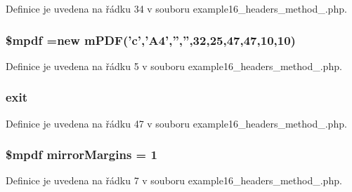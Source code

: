 Definice je uvedena na řádku 34 v souboru example16\-\_\-headers\-\_\-method\-\_.\-php.

\hypertarget{example16__headers__method__2_8php_ad028f81910d6cbab9b184d2214b3a8f8}{
\subsubsection[{\$mpdf}]{\setlength{\rightskip}{0pt plus 5cm}\$mpdf =new {\bf m\-P\-D\-F}('c','A4','','',32,25,47,47,10,10)}}\label{example16__headers__method__2_8php_ad028f81910d6cbab9b184d2214b3a8f8}


Definice je uvedena na řádku 5 v souboru example16\-\_\-headers\-\_\-method\-\_.\-php.

\hypertarget{example16__headers__method__2_8php_a6733eb5f605d09eaede9845835d71c4e}{
\subsubsection[{exit}]{\setlength{\rightskip}{0pt plus 5cm}exit}}\label{example16__headers__method__2_8php_a6733eb5f605d09eaede9845835d71c4e}


Definice je uvedena na řádku 47 v souboru example16\-\_\-headers\-\_\-method\-\_.\-php.

\hypertarget{example16__headers__method__2_8php_a24c284cb7774410f65953584ea1fd9c1}{
\subsubsection[{mirror\-Margins}]{\setlength{\rightskip}{0pt plus 5cm}\$mpdf mirror\-Margins = 1}}\label{example16__headers__method__2_8php_a24c284cb7774410f65953584ea1fd9c1}


Definice je uvedena na řádku 7 v souboru example16\-\_\-headers\-\_\-method\-\_.\-php.


